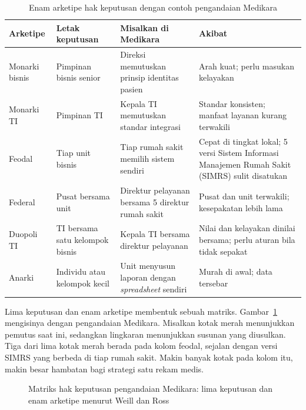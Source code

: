 \begin{table}[!htb]
  \centering\small
  \caption{Enam arketipe hak keputusan dengan contoh pengandaian Medikara}
  \label{tab:ch02-arketipe}
  \begin{tabularx}{\textwidth}{|>{\raggedright\arraybackslash}p{}|>{\raggedright\arraybackslash}p{}|>{\raggedright\arraybackslash}X|>{\raggedright\arraybackslash}X|}
    \hline
    \textbf{Arketipe} & \textbf{Letak keputusan} & \textbf{Misalkan di Medikara} &
    \textbf{Akibat} \\ \hline
    Monarki bisnis & Pimpinan bisnis senior & Direksi memutuskan prinsip identitas pasien &
    Arah kuat; perlu masukan kelayakan \\ \hline
    Monarki TI & Pimpinan TI & Kepala TI memutuskan standar integrasi & Standar konsisten;
    manfaat layanan kurang terwakili \\ \hline
    Feodal & Tiap unit bisnis & Tiap rumah sakit memilih sistem sendiri & Cepat di tingkat
    lokal; 5 versi Sistem Informasi Manajemen Rumah Sakit (SIMRS) sulit disatukan \\ \hline
    Federal & Pusat bersama unit & Direktur pelayanan bersama 5 direktur rumah sakit & Pusat
    dan unit terwakili; kesepakatan lebih lama \\ \hline
    Duopoli TI & TI bersama satu kelompok bisnis & Kepala TI bersama direktur pelayanan &
    Nilai dan kelayakan dinilai bersama; perlu aturan bila tidak sepakat \\ \hline
    Anarki & Individu atau kelompok kecil & Unit menyusun laporan dengan \textit{spreadsheet}
    sendiri & Murah di awal; data tersebar \\ \hline
  \end{tabularx}
\end{table}

Lima keputusan dan enam arketipe membentuk sebuah matriks.
Gambar~\ref{fig:ch02-matriks-arketipe} mengisinya dengan pengandaian Medikara. Misalkan kotak
merah menunjukkan pemutus saat ini, sedangkan lingkaran menunjukkan susunan yang diusulkan.
Tiga dari lima kotak merah berada pada kolom feodal, sejalan dengan versi SIMRS yang berbeda
di tiap rumah sakit. Makin banyak kotak pada kolom itu, makin besar hambatan bagi strategi
satu rekam medis.

\begin{figure}[!htb]
  \centering
  
  \caption{Matriks hak keputusan pengandaian Medikara: lima keputusan dan enam arketipe
  menurut Weill dan Ross}
  \label{fig:ch02-matriks-arketipe}
\end{figure}


